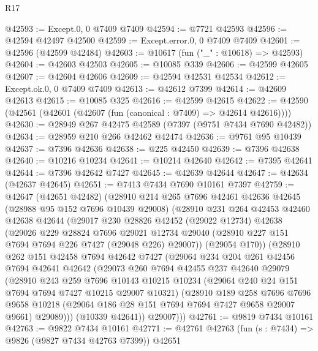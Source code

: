 \begin{lexlean}{R17}
\begin{coremodule}
@42593 := Except.{0, 0} @7409 @7409
@42594 := @7721 @42593
@42596 := @42594 @42497 @42500
@42599 := Except.error.{0, 0} @7409 @7409
@42601 := @42596 (@42599 @42484)
@42603 := @10617 (fun ("_" : @10618) => @42593)
@42604 := @42603 @42503
@42605 := @10085 @339
@42606 := @42599 @42605
@42607 := @42604 @42606
@42609 := @42594 @42531 @42534
@42612 := Except.ok.{0, 0} @7409 @7409
@42613 := @42612 @7399
@42614 := @42609 @42613
@42615 := @10085 @325
@42616 := @42599 @42615
@42622 := @42590 (@42561 (@42601 (@42607 (fun (canonical : @7409) => @42614 @42616))))
@42630 := @28949 @267 @42475 @42589 (@7397 (@9751 @7434 @7690 @42482))
@42634 := @28959 @210 @266 @42462 @42474
@42636 := @9761 @95 @10439
@42637 := @7396 @42636
@42638 := @225 @42450
@42639 := @7396 @42638
@42640 := @10216 @10234
@42641 := @10214 @42640
@42642 := @7395 @42641
@42644 := @7396 @42642 @7427
@42645 := @42639 @42644
@42647 := @42634 (@42637 @42645)
@42651 := @7413 @7434 @7690 @10161 @7397
@42759 := @42647
    (@42651 @42482)
    (@28910
      @214
      @265
      @7696
      @42461
      @42636
      @42645
      (@28988 @95 @152 @7696 @10439 @29008)
      (@28910
        @231
        @264
        @42453
        @42460
        @42638
        @42644
        (@29017
          @230
          @28826
          @42452
          (@29022 @12734)
          @42638
          (@29026
            @229
            @28824
            @7696
            @29021
            @12734
            @29040
            (@28910 @227 @151 @7694 @7694 @226 @7427 (@29048 @226) @29007))
          (@29054 @170))
        (@28910
          @262
          @151
          @42458
          @7694
          @42642
          @7427
          (@29064
            @234
            @204
            @261
            @42456
            @7694
            @42641
            @42642
            (@29073
              @260
              @7694
              @42455
              @237
              @42640
              @29079
              (@28910
                @243
                @259
                @7696
                @10143
                @10215
                @10234
                (@29064 @240 @24 @151 @7694 @7694 @7427 @10215 @29007 @10321)
                (@28910
                  @189
                  @258
                  @7696
                  @7696
                  @9658
                  @10218
                  (@29064 @186 @28 @151 @7694 @7694 @7427 @9658 @29007 @9661)
                  @29089)))
            (@10339 @42641))
          @29007)))
@42761 := @9819 @7434 @10161
@42763 := @9822 @7434 @10161
@42771 := @42761 @42763 (fun (s : @7434) => @9826 (@9827 @7434 @42763 @7399)) @42651

\end{coremodule}
\end{lexlean}
